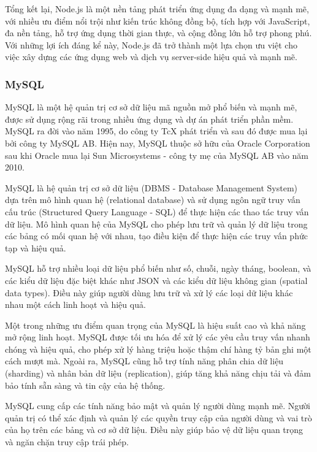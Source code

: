 Tổng kết lại, Node.js là một nền tảng phát triển ứng dụng đa dạng và mạnh mẽ, với nhiều ưu điểm nổi trội như kiến trúc không đồng bộ, tích hợp với JavaScript, đa nền tảng, hỗ trợ ứng dụng thời gian thực, và cộng đồng lớn hỗ trợ phong phú. Với những lợi ích đáng kể này, Node.js đã trở thành một lựa chọn ưu việt cho việc xây dựng các ứng dụng web và dịch vụ server-side hiệu quả và mạnh mẽ.

\subsubsection{MySQL}
\mbox{}

MySQL là một hệ quản trị cơ sở dữ liệu mã nguồn mở phổ biến và mạnh mẽ, được sử dụng rộng rãi trong nhiều ứng dụng và dự án phát triển phần mềm. MySQL ra đời vào năm 1995, do công ty TcX phát triển và sau đó được mua lại bởi công ty MySQL AB. Hiện nay, MySQL thuộc sở hữu của Oracle Corporation sau khi Oracle mua lại Sun Microsystems - công ty mẹ của MySQL AB vào năm 2010. \cite{mysql_1}

MySQL là hệ quản trị cơ sở dữ liệu (DBMS - Database Management System) dựa trên mô hình quan hệ (relational database) và sử dụng ngôn ngữ truy vấn cấu trúc (Structured Query Language - SQL) để thực hiện các thao tác truy vấn dữ liệu. Mô hình quan hệ của MySQL cho phép lưu trữ và quản lý dữ liệu trong các bảng có mối quan hệ với nhau, tạo điều kiện để thực hiện các truy vấn phức tạp và hiệu quả. \cite{myql_2}

MySQL hỗ trợ nhiều loại dữ liệu phổ biến như số, chuỗi, ngày tháng, boolean, và các kiểu dữ liệu đặc biệt khác như JSON và các kiểu dữ liệu không gian (spatial data types). Điều này giúp người dùng lưu trữ và xử lý các loại dữ liệu khác nhau một cách linh hoạt và hiệu quả.

Một trong những ưu điểm quan trọng của MySQL là hiệu suất cao và khả năng mở rộng linh hoạt. MySQL được tối ưu hóa để xử lý các yêu cầu truy vấn nhanh chóng và hiệu quả, cho phép xử lý hàng triệu hoặc thậm chí hàng tỷ bản ghi một cách mượt mà. Ngoài ra, MySQL cũng hỗ trợ tính năng phân chia dữ liệu (sharding) và nhân bản dữ liệu (replication), giúp tăng khả năng chịu tải và đảm bảo tính sẵn sàng và tin cậy của hệ thống.

MySQL cung cấp các tính năng bảo mật và quản lý người dùng mạnh mẽ. Người quản trị có thể xác định và quản lý các quyền truy cập của người dùng và vai trò của họ trên các bảng và cơ sở dữ liệu. Điều này giúp bảo vệ dữ liệu quan trọng và ngăn chặn truy cập trái phép.

